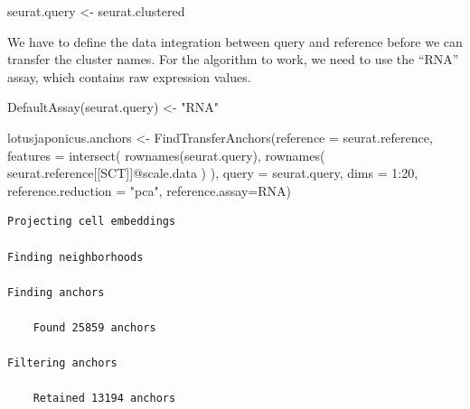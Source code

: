 \documentclass[
  letterpaper,
  DIV=11,
  numbers=noendperiod]{scrartcl}
\newenvironment{Shaded}{}{}
\newcommand{\AttributeTok}[1]{\textcolor[rgb]{0.49,0.56,0.16}{#1}}
\newcommand{\DecValTok}[1]{\textcolor[rgb]{0.25,0.63,0.44}{#1}}
\newcommand{\FunctionTok}[1]{\textcolor[rgb]{0.02,0.16,0.49}{#1}}
\newcommand{\NormalTok}[1]{#1}
\newcommand{\OtherTok}[1]{\textcolor[rgb]{0.00,0.44,0.13}{#1}}
\newcommand{\SpecialCharTok}[1]{\textcolor[rgb]{0.25,0.44,0.63}{#1}}
\newcommand{\StringTok}[1]{\textcolor[rgb]{0.25,0.44,0.63}{#1}}
\begin{document}
\begin{Shaded}
\begin{Highlighting}[]
\NormalTok{seurat.query }\OtherTok{\textless{}{-}}\NormalTok{ seurat.clustered}
\end{Highlighting}
\end{Shaded}

We have to define the data integration between query and reference
before we can transfer the cluster names. For the algorithm to work, we
need to use the ``RNA'' assay, which contains raw expression values.

\begin{Shaded}
\begin{Highlighting}[]
\FunctionTok{DefaultAssay}\NormalTok{(seurat.query) }\OtherTok{\textless{}{-}} \StringTok{"RNA"}
\end{Highlighting}
\end{Shaded}

\begin{Shaded}
\begin{Highlighting}[]
\NormalTok{lotusjaponicus.anchors }\OtherTok{\textless{}{-}} \FunctionTok{FindTransferAnchors}\NormalTok{(}\AttributeTok{reference =}\NormalTok{ seurat.reference, }
                                        \AttributeTok{features =} \FunctionTok{intersect}\NormalTok{( }\FunctionTok{rownames}\NormalTok{(seurat.query), }
                                                   \FunctionTok{rownames}\NormalTok{( seurat.reference[[}\StringTok{\textquotesingle{}SCT\textquotesingle{}}\NormalTok{]]}\SpecialCharTok{@}\NormalTok{scale.data ) ),}
                                        \AttributeTok{query =}\NormalTok{ seurat.query, }\AttributeTok{dims =} \DecValTok{1}\SpecialCharTok{:}\DecValTok{20}\NormalTok{, }
                                        \AttributeTok{reference.reduction =} \StringTok{"pca"}\NormalTok{,}
                                        \AttributeTok{reference.assay=}\StringTok{\textquotesingle{}RNA\textquotesingle{}}\NormalTok{)}
\end{Highlighting}
\end{Shaded}

\begin{verbatim}
Projecting cell embeddings

Finding neighborhoods

Finding anchors

    Found 25859 anchors

Filtering anchors

    Retained 13194 anchors
\end{verbatim}
\end{document}
